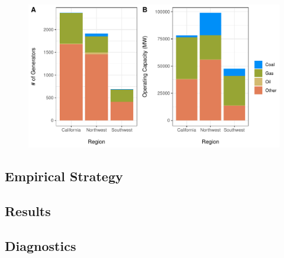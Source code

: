 \begin{figure}
    \includegraphics[width=\textwidth]{figures/chapter5_figures/regional_gens.pdf}
\end{figure}


\subsection{Empirical Strategy}



\subsection{Results}



\subsection{Diagnostics}





